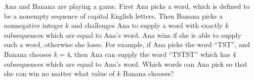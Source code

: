 \documentclass[10pt, a4paper]{article}
\begin{document}
\begin{prob}
Ana and Banana are playing a game.
First Ana picks a word, which is defined to be a nonempty sequence of capital English letters.
Then Banana picks a nonnegative integer $k$ and challenges Ana to supply a word with exactly $k$ subsequences which are equal to Ana's word.
Ana wins if she is able to supply such a word, otherwise she loses.
For example, if Ana picks the word ``TST'',
and Banana chooses $k=4$, then Ana can supply the word ``TSTST'' which has 4 subsequences which are equal to Ana's word.
Which words can Ana pick so that she can win no matter what value of $k$ Banana chooses?
\end{prob}
\end{document}
